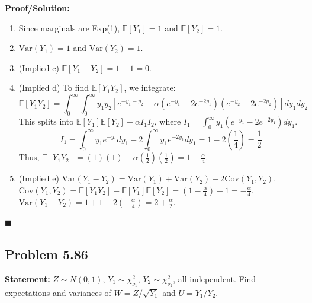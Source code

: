 \documentclass[11pt, a4paper]{article}
\theoremstyle{definition}
\theoremstyle{remark}
\newcommand{\E}{\mathbb{E}}
\newcommand{\Var}{\mathrm{Var}}
\newcommand{\Cov}{\mathrm{Cov}}
\begin{document}
\textbf{Proof/Solution:}
\begin{enumerate}[label=\alph*)]
    \item Since marginals are Exp(1), $\E[Y_1] = 1$ and $\E[Y_2] = 1$.
    \item $\Var(Y_1) = 1$ and $\Var(Y_2) = 1$.
    \item (Implied c) $\E[Y_1 - Y_2] = 1 - 1 = 0$.
    \item (Implied d) To find $\E[Y_1 Y_2]$, we integrate:
    \[
    \E[Y_1 Y_2] = \int_0^\infty \int_0^\infty y_1 y_2 \left[ e^{-y_1-y_2} - \alpha(e^{-y_1} - 2e^{-2y_1})(e^{-y_2} - 2e^{-2y_2}) \right] dy_1 dy_2
    \]
    This splits into $\E[Y_1]\E[Y_2] - \alpha I_1 I_2$, where $I_1 = \int_0^\infty y_1(e^{-y_1} - 2e^{-2y_1}) dy_1$.
    \[
    I_1 = \int_0^\infty y_1 e^{-y_1} dy_1 - 2 \int_0^\infty y_1 e^{-2y_1} dy_1 = 1 - 2\left(\frac{1}{4}\right) = \frac{1}{2}
    \]
    Thus, $\E[Y_1 Y_2] = (1)(1) - \alpha\left(\frac{1}{2}\right)\left(\frac{1}{2}\right) = 1 - \frac{\alpha}{4}$.
    \item (Implied e) $\Var(Y_1 - Y_2) = \Var(Y_1) + \Var(Y_2) - 2\Cov(Y_1, Y_2)$. \\ \relax
    $\Cov(Y_1, Y_2) = \E[Y_1 Y_2] - \E[Y_1]\E[Y_2] = \left(1 - \frac{\alpha}{4}\right) - 1 = -\frac{\alpha}{4}$. \\ \relax
    $\Var(Y_1 - Y_2) = 1 + 1 - 2\left(-\frac{\alpha}{4}\right) = 2 + \frac{\alpha}{2}$.
\end{enumerate}
\hfill $\blacksquare$

\subsection{Problem 5.86}
\textbf{Statement:} $Z \sim N(0,1)$, $Y_1 \sim \chi^2_{\nu_1}$, $Y_2 \sim \chi^2_{\nu_2}$, all independent. Find expectations and variances of $W = Z/\sqrt{Y_1}$ and $U = Y_1/Y_2$.
\end{document}
